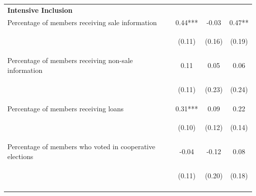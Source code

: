 \documentclass[11pt]{article}
\begin{document}
\begin{table}[H]
{\begin{tabularx}{1.1\linewidth}{lccc}
 \textbf{Intensive Inclusion} & & & \\
\noalign{\smallskip}Percentage of members receiving sale information & 0.44*** & -0.03 & 0.47**\\
 & \begin{footnotesize}(0.11)\end{footnotesize} & \begin{footnotesize}(0.16)\end{footnotesize} & \begin{footnotesize}(0.19)\end{footnotesize}\\
\noalign{\smallskip}Percentage of members receiving non-sale information & 0.11 & 0.05 & 0.06\\
 & \begin{footnotesize}(0.11)\end{footnotesize} & \begin{footnotesize}(0.23)\end{footnotesize} & \begin{footnotesize}(0.24)\end{footnotesize}\\
\noalign{\smallskip}Percentage of members receiving loans & 0.31*** & 0.09 & 0.22\\
 & \begin{footnotesize}(0.10)\end{footnotesize} & \begin{footnotesize}(0.12)\end{footnotesize} & \begin{footnotesize}(0.14)\end{footnotesize}\\
\noalign{\smallskip}Percentage of members who voted in cooperative elections & -0.04 & -0.12 & 0.08\\
 & \begin{footnotesize}(0.11)\end{footnotesize} & \begin{footnotesize}(0.20)\end{footnotesize} & \begin{footnotesize}(0.18)\end{footnotesize}\\
\noalign{\smallskip}\hline
  \end{tabularx}}
\end{table}
\doublespacing




\end{document}
